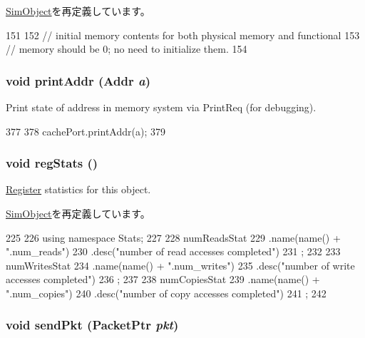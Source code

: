\hyperlink{classSimObject_a02fd73d861ef2e4aabb38c0c9ff82947}{SimObject}を再定義しています。


\begin{DoxyCode}
151 {
152     // initial memory contents for both physical memory and functional
153     // memory should be 0; no need to initialize them.
154 }
\end{DoxyCode}
\hypertarget{classMemTest_a88aa41e2693dd0091afae2604eba9bed}{
\subsubsection[{printAddr}]{\setlength{\rightskip}{0pt plus 5cm}void printAddr ({\bf Addr} {\em a})}}
\label{classMemTest_a88aa41e2693dd0091afae2604eba9bed}
Print state of address in memory system via PrintReq (for debugging). 


\begin{DoxyCode}
377 {
378     cachePort.printAddr(a);
379 }
\end{DoxyCode}
\hypertarget{classMemTest_a4dc637449366fcdfc4e764cdf12d9b11}{
\subsubsection[{regStats}]{\setlength{\rightskip}{0pt plus 5cm}void regStats ()}}
\label{classMemTest_a4dc637449366fcdfc4e764cdf12d9b11}
\hyperlink{classRegister}{Register} statistics for this object. 

\hyperlink{classSimObject_a4dc637449366fcdfc4e764cdf12d9b11}{SimObject}を再定義しています。


\begin{DoxyCode}
225 {
226     using namespace Stats;
227 
228     numReadsStat
229         .name(name() + ".num_reads")
230         .desc("number of read accesses completed")
231         ;
232 
233     numWritesStat
234         .name(name() + ".num_writes")
235         .desc("number of write accesses completed")
236         ;
237 
238     numCopiesStat
239         .name(name() + ".num_copies")
240         .desc("number of copy accesses completed")
241         ;
242 }
\end{DoxyCode}
\hypertarget{classMemTest_afd43ca83ca8c1d5fde8a2f349aa2cdc0}{
\subsubsection[{sendPkt}]{\setlength{\rightskip}{0pt plus 5cm}void sendPkt ({\bf PacketPtr} {\em pkt})}}
\label{classMemTest_afd43ca83ca8c1d5fde8a2f349aa2cdc0}



